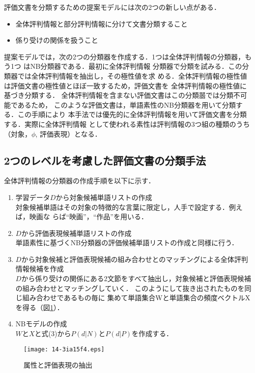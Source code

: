 \documentclass[japanese]{jnlp_1.3c}
\begin{document}
評価文書を分類するための提案モデルには次の2つの新しい点がある．
\begin{itemize}
\item 全体評判情報と部分評判情報に分けて文書分類すること
\item 係り受けの関係を扱うこと
\end{itemize}

提案モデルでは，次の2つの分類器を作成する．1つは全体評判情報の分類器，もう1つ
はNB分類器である．最初に全体評判情報
分類器で分類を試みる．この分類器では全体評判情報を抽出し，その極性値を求
める．全体評判情報の極性値は評価文書の極性値とほぼ一致するため，評価文書を
全体評判情報の極性値に基づき分類する．
全体評判情報を含まない評価文書はこの分類噐では分類不可能であるため，
このような評価文書は，単語素性のNB分類器を用いて分類する．この手順により
本手法では優先的に全体評判情報を用いて評価文書を分類する．実際に全体評判情報
として使われる素性は評判情報の3つ組の種類のうち（対象，$\phi$, 評価表現）となる．

\subsection{2つのレベルを考慮した評価文書の分類手法}

全体評判情報の分類器の作成手順を以下に示す．
\begin{enumerate}
\item 学習データ$D$から対象候補単語リストの作成\\
 対象候補単語はその対象の特徴的な言葉に限定し，人手で設定する．例えば，映画な
らば``映画''，``作品''を用いる．
\item $D$から評価表現候補単語リストの作成\\
単語素性に基づくNB分類器の評価候補単語リストの作成と同様に行う．
\item $D$から対象候補と評価表現候補の組み合わせとのマッチングによる全体評判情報候補を作成\\
$D$から係り受けの関係にある2文節をすべて抽出し，対象候補と評価表現候補の組み合わせとマッチングしていく．
このようにして抜き出されたものを同じ組み合わせであるもの毎に
集めて単語集合Wと単語集合の頻度ベクトルXを得る（図\ref{fig:3.5}）．
\item NBモデルの作成\\
$W$と$X$と式(3)から$P(d|N)$と$P(d|P)$を作成する．
\end{enumerate}


\begin{figure}[t]
 \begin{center}
    \texttt{[image: 14-3ia15f4.eps]}
  \caption{属性と評価表現の抽出}
  \label{fig:3.5}
 \end{center}
\end{figure}
\end{document}
